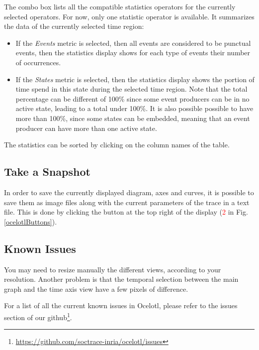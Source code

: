 \documentclass[twoside]{article}
\begin{document}
\begin{sloppypar}
The combo box lists all the compatible statistics operators for the currently selected operators. For now, only one statistic operator is available. It summarizes the data of the currently selected time region:
\begin{itemize} 
	\item If the \textit{Events} metric is selected, then all events are considered to be punctual events, then the statistics display shows for each type of events their number of occurrences.
	\item If the \textit{States} metric is selected, then the statistics display shows the portion of time spend in this state during the selected time region. Note that the total percentage can be different of 100\% since some event producers can be in no active state, leading to a total under 100\%. It is also possible possible to have more than 100\%, since some states can be embedded, meaning that an event producer can have more than one active state.
\end{itemize}

The statistics can be sorted by clicking on the column names of the table.

\subsection{Take a Snapshot}
In order to save the currently displayed diagram, axes and curves, it is possible to save them as image files along with the current parameters of the trace in a text file. This is done by clicking the button at the top right of the display (\textcolor{red}{2} in Fig. \ref{ocelotlButtons}).

\subsection{Known Issues}
You may need to resize manually the different views, according to your resolution. Another problem is that the temporal selection between the main graph and the time axis view have a few pixels of difference.

For a list of all the current known issues in Ocelotl, please refer to the issues section of our github\footnote{\url{https://github.com/soctrace-inria/ocelotl/issues}}.

\newpage

\newpage

{}

\end{sloppypar} 
\end{document}
